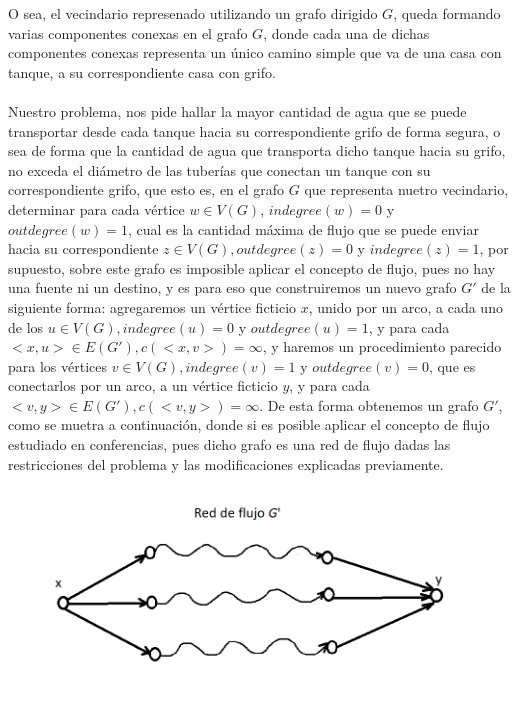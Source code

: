 \documentclass{article}
\begin{document}
    O sea, el vecindario represenado utilizando un grafo dirigido $G$, queda formando varias componentes conexas en el grafo $G$,
    donde cada una de dichas componentes conexas representa un \'unico camino simple que va de una casa con tanque, a su correspondiente
    casa con grifo.\\\\

    Nuestro problema, nos pide hallar la mayor cantidad de agua que se puede transportar desde cada tanque hacia su correspondiente grifo de forma segura, o sea 
    de forma que la cantidad de agua que transporta dicho tanque hacia su grifo, no exceda el di\'ametro de las tuber\'ias que conectan un tanque con su correspondiente
    grifo, que esto es, en el grafo $G$ que representa nuetro vecindario, determinar para cada v\'ertice $w \in V(G)$, $indegree(w) = 0$ y $outdegree(w) = 1$, cual es la cantidad m\'axima
    de flujo que se puede enviar hacia su correspondiente $z \in V(G), outdegree(z) = 0$ y $indegree(z) = 1$, por supuesto, sobre este grafo es imposible  aplicar el concepto de flujo,
    pues no hay una fuente ni un destino, y es para eso que construiremos un nuevo grafo $G'$ de la siguiente forma: agregaremos un v\'ertice ficticio $x$, unido por un arco, a cada uno de los $u \in V(G), indegree(u) = 0$ y $outdegree(u) = 1$, y para cada 
    $<x,u> \in E(G'), c(<x,v>) = \infty$, y haremos un procedimiento parecido para los v\'ertices $v \in V(G), indegree(v) = 1$ y $outdegree(v) = 0$, que es conectarlos por un arco, a un v\'ertice ficticio $y$, y
    para cada $<v,y> \in E(G'), c(<v,y>) = \infty$. De esta forma obtenemos un grafo $G'$, como se muetra a continuaci\'on, donde si es posible aplicar el concepto de flujo estudiado en conferencias, pues dicho grafo es una red de flujo
    dadas las restricciones del problema y las modificaciones explicadas previamente.\\
    
    \begin{figure}[h]
        \includegraphics[scale = 0.5]{img/Image2Problem1.png}
        \centering
    \end{figure}
\end{document}
